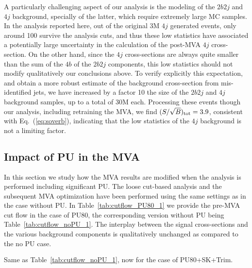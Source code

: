 A particularly challenging aspect of our analysis is the modeling of the $2b2j$ and $4j$ background,
specially of the latter, which require extremely large MC samples.
%
In the analysis reported here, out of the original 3M $4j$ generated events, only around 100
survive the analysis cuts, and thus
these low statistics have associated a potentially large uncertainty
in the calculation of the post-MVA $4j$ cross-section.
%
On the other hand, since the $4j$ cross-sections
are always quite smaller than the sum of the $4b$ of the $2b2j$ components,
this low statistics should not modify qualitatively our conclusions above.
%
To verify explicitly this expectation, and obtain a more
robust estimate of the  background cross-section from mis-identified jets,
we have increased by a factor 10 the size of the $2b2j$ and $4j$
background samples, up to a total of 30M each.
%
Processing these events though our analysis, including retraining the MVA, we find
$(S/\sqrt{B})_{\rm tot}=3.9$, consistent with Eq.~(\ref{eq:soverb}), indicating that the low
statistics of the $4j$ background is not a limiting factor.

\subsection{Impact of PU in the MVA}

In this section we study how the MVA results are modified
when the analysis is performed including significant PU.
%
The loose cut-based analysis and the subsequent
MVA optimization have been performed using the same
settings as in the case without PU.
%
In Table~\ref{tab:cutflow_PU80_1}
we provide the pre-MVA cut flow in the case of PU80,
the corresponding version without PU being
Table~\ref{tab:cutflow_noPU_1}.
%
The interplay between the signal cross-sections and the various
background components is qualitatively unchanged as compared
to the no PU case.

\begin{table}[t]
  \centering
  \scriptsize
      
    \caption{\small Same as Table~\ref{tab:cutflow_noPU_1},
now for the case
    of PU80+SK+Trim.
 \label{tab:cutflow_PU80_1}}
\end{table}

